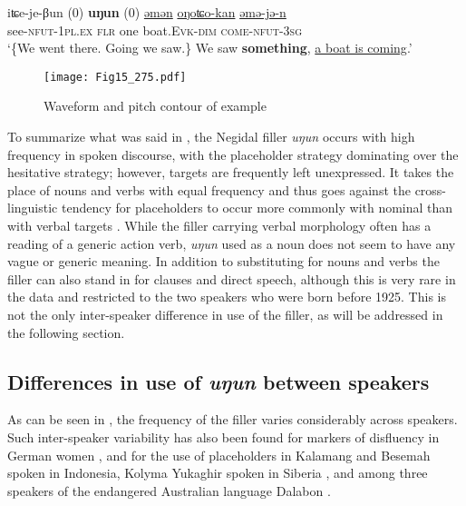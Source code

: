 \documentclass[output=paper]{langscibook}
\begin{document}
\ea \label{ex:pakendorf:44}
\gll iʨe-je-βun
	\textup{(0)}
	\textbf{uŋun}
	\textup{(0)}
	\uline{əmən}
	\uline{oŋoʨo-kan}
	\uline{əmə-jə-n}\\
     see-\textsc{nfut-1pl.ex}
     {}
     \textsc{flr}
     {}
     one
     boat.E\textsc{vk}-\textsc{dim}
     \textsc{come-nfut-3sg}\\
\glt ‘\{We went there. Going we saw.\} We saw \textbf{something}, \uline{a boat is coming}.’ 
\z

\begin{figure}
\texttt{[image: Fig15\_275.pdf]}
\caption{Waveform and pitch contour of example }
\label{fig:pakendorf:15}
\end{figure}

To summarize what was said in , the Negidal filler \textit{uŋun} occurs with high frequency in spoken discourse, with the placeholder strategy dominating over the hesitative strategy; however, targets are frequently left unexpressed. It takes the place of nouns and verbs with equal frequency and thus goes against the cross-linguistic tendency for placeholders to occur more commonly with nominal than with verbal targets \citep[13]{Podlesskaya2010}. While the filler carrying verbal morphology often has a reading of a generic action verb, \textit{uŋun} used as a noun does not seem to have any vague or generic meaning. In addition to substituting for nouns and verbs the filler can also stand in for clauses and direct speech, although this is very rare in the data and restricted to the two speakers who were born before 1925. This is not the only inter-speaker difference in use of the filler, as will be addressed in the following section.

\subsection{Differences in use of \textit{uŋun} between speakers}
\label{sec:pakendorf:4.2}

As can be seen in , the frequency of the filler varies considerably across speakers. Such inter-speaker variability has also been found for markers of disfluency in German women \citep{BraunBraun2023}, and for the use of placeholders in Kalamang \citep{chapters/visser} and Besemah \citep{chapters/mcdonnell_billings} spoken in Indonesia, Kolyma Yukaghir spoken in Siberia \citep{chapters/ventayol_boada}, and among three speakers of the endangered Australian language Dalabon \citep{chapters/ponsonnet}.
\end{document}
